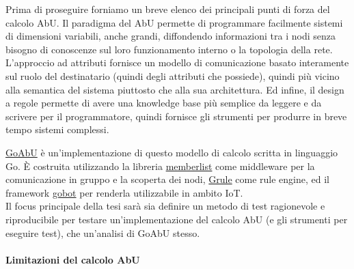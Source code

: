 \documentclass[12pt, a4paper]{article}
\begin{document}
Prima di proseguire forniamo un breve elenco dei principali punti di forza del calcolo AbU. Il paradigma del AbU permette di programmare facilmente sistemi di dimensioni variabili, anche grandi, diffondendo informazioni tra i nodi senza bisogno di conoscenze sul loro funzionamento interno o la topologia della rete.
L'approccio ad attributi fornisce un modello di comunicazione basato interamente sul ruolo del destinatario (quindi degli attributi che possiede), quindi più vicino alla semantica del sistema piuttosto che alla sua architettura.
Ed infine, il design a regole permette di avere una knowledge base più semplice da leggere e da scrivere per il programmatore, quindi fornisce gli strumenti per produrre in breve tempo sistemi complessi.

\href{https://github.com/abu-lang/goabu}{GoAbU} è un'implementazione di questo modello di calcolo scritta in linguaggio Go.
È costruita utilizzando la libreria \href{https://github.com/hashicorp/memberlist}{memberlist} come middleware per la comunicazione in gruppo e la scoperta dei nodi,  \href{https://github.com/hyperjumptech/grule-rule-engine}{Grule} come rule engine, ed il framework \href{https://github.com/hybridgroup/gobot/}{gobot} per renderla utilizzabile in ambito IoT.\\
Il focus principale della tesi sarà sia definire un metodo di test ragionevole e riproducibile per testare un'implementazione del calcolo AbU (e gli strumenti per eseguire test), che un'analisi di GoAbU stesso.

\paragraph{Limitazioni del calcolo AbU}
\end{document}

